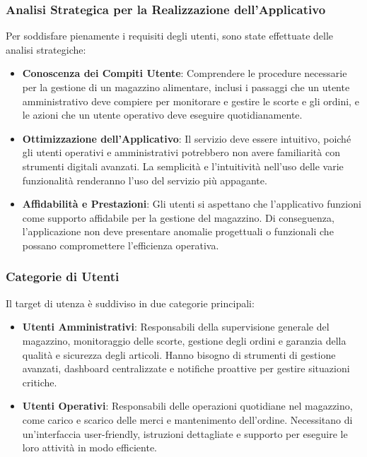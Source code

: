 \subsubsection{Analisi Strategica per la Realizzazione dell'Applicativo}

Per soddisfare pienamente i requisiti degli utenti, sono state effettuate delle analisi strategiche:

\begin{itemize}
    \item \textbf{Conoscenza dei Compiti Utente}: Comprendere le procedure necessarie per la gestione di un magazzino alimentare, inclusi i passaggi che un utente amministrativo deve compiere per monitorare e gestire le scorte e gli ordini, e le azioni che un utente operativo deve eseguire quotidianamente.
    \item \textbf{Ottimizzazione dell’Applicativo}: Il servizio deve essere intuitivo, poiché gli utenti operativi e amministrativi potrebbero non avere familiarità con strumenti digitali avanzati. La semplicità e l'intuitività nell'uso delle varie funzionalità renderanno l'uso del servizio più appagante.
    \item \textbf{Affidabilità e Prestazioni}: Gli utenti si aspettano che l'applicativo funzioni come supporto affidabile per la gestione del magazzino. Di conseguenza, l’applicazione non deve presentare anomalie progettuali o funzionali che possano compromettere l’efficienza operativa.
\end{itemize}

\subsubsection{Categorie di Utenti}

Il target di utenza è suddiviso in due categorie principali:

\begin{itemize}
    \item \textbf{Utenti Amministrativi}: Responsabili della supervisione generale del magazzino, monitoraggio delle scorte, gestione degli ordini e garanzia della qualità e sicurezza degli articoli. Hanno bisogno di strumenti di gestione avanzati, dashboard centralizzate e notifiche proattive per gestire situazioni critiche.
    \item \textbf{Utenti Operativi}: Responsabili delle operazioni quotidiane nel magazzino, come carico e scarico delle merci e mantenimento dell'ordine. Necessitano di un’interfaccia user-friendly, istruzioni dettagliate e supporto per eseguire le loro attività in modo efficiente.
\end{itemize}

